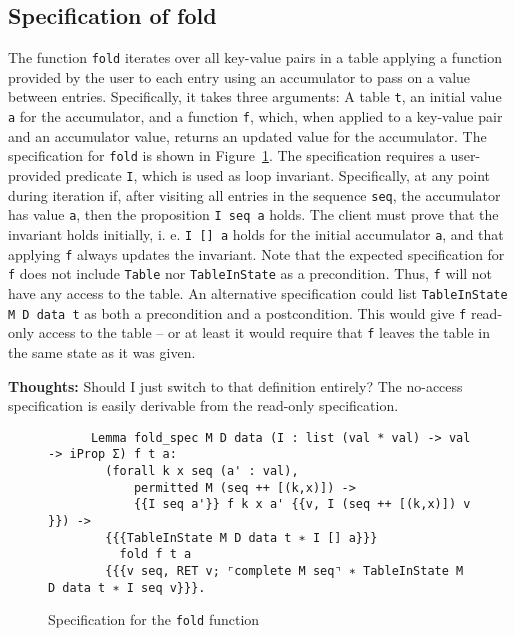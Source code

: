 \documentclass[10pt,a4paper]{article}
\renewcommand{\fcolorbox}[4][]{#4}}
\newcommand{\thoughts}[1]{\noindent\fcolorbox{black}{cyan}{\parbox{\textwidth}{\textbf{Thoughts:} \linebreak #1}}}
\begin{document}
\subsection{Specification of fold}
\label{sec:fold_spec}
The function \texttt{fold} iterates over all key-value pairs in a table applying a function provided by the user to each entry using an accumulator to pass on a value between entries. Specifically, it takes three arguments: A table \texttt{t}, an initial value \texttt{a} for the accumulator, and a function \texttt{f}, which, when applied to a key-value pair and an accumulator value, returns an updated value for the accumulator. The specification for \texttt{fold} is shown in Figure~\ref{fig:fold_spec}. The specification requires a user-provided predicate \texttt{I}, which is used as loop invariant. Specifically, at any point during iteration if, after visiting all entries in the sequence \texttt{seq}, the accumulator has value \texttt{a}, then the proposition \texttt{I seq a} holds. The client must prove that the invariant holds initially, i. e. \texttt{I [] a} holds for the initial accumulator \texttt{a}, and that applying \texttt{f} always updates the invariant. Note that the expected specification for \texttt{f} does not include \texttt{Table} nor \texttt{TableInState} as a precondition. Thus, \texttt{f} will not have any access to the table. An alternative specification could list \texttt{TableInState M D data t} as both a precondition and a postcondition. This would give \texttt{f} read-only access to the table -- or at least it would require that \texttt{f} leaves the table in the same state as it was given.

\thoughts{Should I just switch to that definition entirely? The no-access specification is easily derivable from the read-only specification.}

\begin{figure}
\begin{verbatim}
      Lemma fold_spec M D data (I : list (val * val) -> val -> iProp Σ) f t a:
        (forall k x seq (a' : val),
            permitted M (seq ++ [(k,x)]) ->
            {{I seq a'}} f k x a' {{v, I (seq ++ [(k,x)]) v }}) ->
        {{{TableInState M D data t ∗ I [] a}}}
          fold f t a
        {{{v seq, RET v; ⌜complete M seq⌝ ∗ TableInState M D data t ∗ I seq v}}}.
\end{verbatim}
\caption{Specification for the \texttt{fold} function}
\label{fig:fold_spec}
\end{figure}
\end{document}
